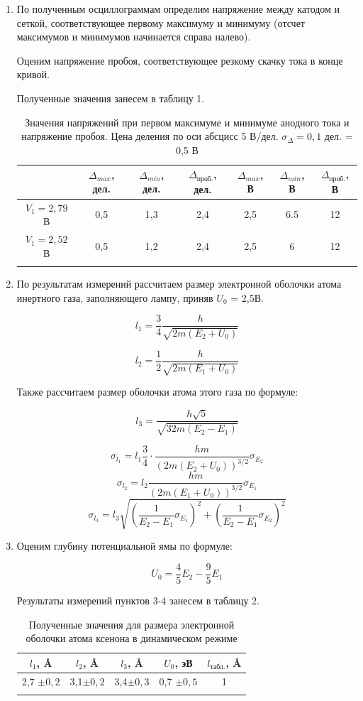 \documentclass[a4paper, 12pt]{article}%
\begin{document}
\begin{enumerate}
	
	\item По полученным осциллограммам определим напряжение между катодом и сеткой, соответствующее первому максимуму и минимуму (отсчет максимумов и минимумов начинается справа налево).
	
	Оценим напряжение пробоя, соответствующее резкому скачку тока в конце кривой.
	
	Полученные значения занесем в таблицу 1.
	
	\begin{longtable}{|c|c|c|c|c|c|c|}
		\hline
		& $\Delta_{max}$, дел. & $\Delta_{min}$, дел. & $\Delta_{\text{проб.}}$, дел. & $\Delta_{max}$, В & $\Delta_{min}$, В & $\Delta_{\text{проб.}}$, В \\ \hline
		$V_1 = 2,79$ В & 0,5 & 1,3 & 2,4 & 2,5 & 6.5 & 12 \\ \hline 	
		$V_1 = 2,52$ В & 0,5 & 1,2 & 2,4 & 2,5 & 6 & 12 \\ \hline
		
		\caption{Значения напряжений при первом максимуме и минимуме анодного тока и напряжение пробоя. Цена деления по оси абсцисс 5 В/дел. $\sigma_{\Delta} = 0,1$ дел. = 0,5 В}
	\end{longtable}
	
	\newpage
	\item По результатам измерений рассчитаем размер электронной оболочки атома инертного газа, заполняющего лампу, приняв $U_0$ = 2,5В.
	
	$$ l_1 = \frac{3}{4} \frac{h}{\sqrt{2m(E_2 + U_0)}} $$
	
	$$ l_2 = \frac{1}{2} \frac{h}{\sqrt{2m(E_1 + U_0)}} $$
	
	Также рассчитаем размер оболочки атома этого газа по формуле:
	
	$$ l_3 = \frac{h\sqrt{5}}{\sqrt{32m(E_2 - E_1)}} $$
	
	$$ \sigma_{l_1} = l_1\frac{3}{4} \cdot \frac{hm}{(2m(E_2 + U_0))^{3/2}} \sigma_{E_2} $$
	$$ \sigma_{l_2} = l_2 \frac{hm}{(2m(E_1 + U_0))^{3/2}} \sigma_{E_1}$$
	$$ \sigma_{l_3} = l_3 \sqrt{ \left( \frac{1}{E_2 - E_1} \sigma_{E_1} \right)^2 + \left(  \frac{1}{E_2 - E_1} \sigma_{E_2} \right) ^2}$$
	
	\item Оценим глубину потенциальной ямы по формуле: 
	
	$$ U_0 = \frac{4}{5} E_2 - \frac{9}{5} E_1$$
	
	Результаты измерений пунктов 3-4 занесем в таблицу 2.
	
	\begin{longtable}{|c|c|c|c|c|}
		\hline
		$l_1$, \AA & $l_2$, \AA & $l_3$, \AA & $U_0$, эВ & $l_{\text{табл.}}$, \AA\\ \hline
		2,7 $\pm0,2$ & 3,1$\pm0,2$ & 3,4$\pm0,3$ & 0,7 $\pm0,5$ & 1\\ \hline
		\caption{Полученные значения для размера электронной оболочки атома ксенона в динамическом режиме}
	\end{longtable}
	

\end{enumerate}
\end{document}
